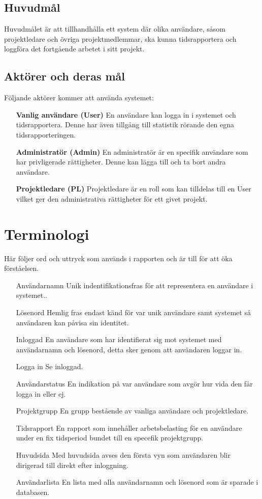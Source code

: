 \documentclass[a4paper]{article}
\begin{document}
\subsection{Huvudmål}
Huvudmålet är att tillhandhålla ett system där olika användare, såsom projektledare och övriga projektmedlemmar, ska kunna tidsrapportera och loggföra det fortgående arbetet i sitt projekt. 

\subsection{Aktörer och deras mål}
Följande aktörer kommer att använda systemet:
\begin{itemize}
\item [] \textbf{Vanlig användare (User)} En användare kan logga in i systemet och tidsrapportera. Denne har även tillgång till statistik rörande den egna tidsrapporteringen.
\item [] \textbf{Administratör (Admin)} En administratör är en specifik användare som har privligerade rättigheter. Denne kan lägga till och ta bort andra användare.
\item [] \textbf{Projektledare (PL)} Projektledare är en roll som kan tilldelas till en User vilket ger den administrativa rättigheter för ett givet projekt.
\end{itemize}

\section{Terminologi}
Här följer ord och uttryck som används i rapporten och är till för att öka förståelsen.
\begin{itemize}
\item [Användarnamn] Unik indentifikationsfras för att representera en användare i systemet..
\item [Lösenord] Hemlig fras endast känd för var unik användare samt systemet så användaren kan påvisa sin identitet.
\item [Inloggad] En användare som har identifierat sig mot systemet med användarnamn och lösenord, detta sker genom att användaren loggar in.
\item [Logga in] Se inloggad.
\item [Användarstatus] En indikation på var användare som avgör hur vida den får logga in eller ej.
\item [Projektgrupp] En grupp bestående av vanliga användare och projektledare.
\item [Tidsrapport] En rapport som innehåller arbetsbelasting för en användare under en fix tidsperiod bundet till en specefik projektgrupp.
\item [Huvudsida] Med huvudsida avses den första vyn som användaren blir dirigerad till direkt efter inloggning. 
\item [Användarlista] En lista med alla användarnamn och lösenord som är sparade i databasen.
\end{itemize}
\end{document}
